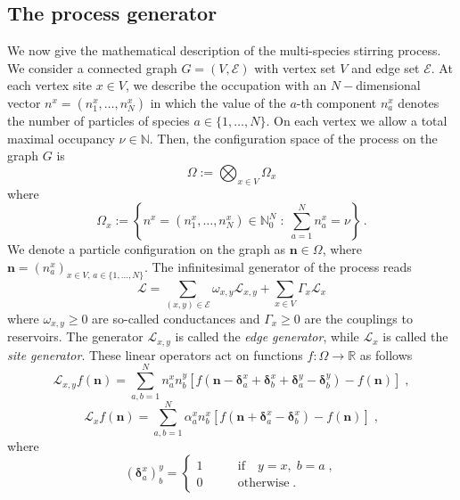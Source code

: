 \documentclass[10pt]{article}
\numberwithin{equation}{section}
\numberwithin{equation}{subsection}
\newcommand{\co}{\;,}
\newcommand{\dt}{\;.}
\newcommand{\twoj}{\nu}
\begin{document}
\subsection{The process generator}\label{subsectionGeneratorStr}
We now give the mathematical description of the multi-species stirring process.
We consider a connected graph $G=(V,\mathcal{E})$ with vertex set $V$ and edge set $\mathcal{E}$.
At each vertex site $x\in V$, we describe the occupation with an $N-$dimensional vector $n^{x}=(n_{1}^{x},\ldots,n_{N}^{x})$ in which the value of the $a$-th component $n_{a}^{x}$ denotes the number of particles of species $a\in \{1,\ldots,N\}$. On each vertex we allow a total  maximal occupancy $\nu\in \mathbb{N}$. Then, the configuration space of the process on the graph $G$ is 
\begin{equation}\label{stateSpace}
    \Omega:=\bigotimes_{x\in V} \Omega_{x}
\end{equation}
where
\begin{equation}
\Omega_{x}:=\left\{n^x=(n_{1}^{x},\ldots,n_{N}^{x})\in\mathbb{N}_0^{N}\;:\; \sum_{a=1}^{N}n_{a}^{x}=\twoj\right\}\,.
\end{equation}
We denote a particle configuration on the graph as $\bm{n}\in \Omega$, where $\bm{n}=(n_{a}^{x})_{x\in V,\,a\in\{1,\ldots,N\}}$.
The infinitesimal generator of the process reads
\begin{equation}\label{Generator}
    \mathcal{L}=\sum_{(x,y)\in \mathcal{E}}\omega_{x,y}\mathcal{L}_{x,y}+\sum_{x\in V}\Gamma_{x}\mathcal{L}_{x}
\end{equation}
where  $ \omega_{x,y}\geq 0$ are so-called conductances and $\Gamma_{x}\geq 0$ are the couplings to reservoirs. 
The generator $\mathcal{L}_{x,y}$ is called the \textit{edge generator}, while $\mathcal{L}_{x}$ is called the \textit{site generator}. These linear operators act on functions $f:\Omega\to \mathbb{R}$ as follows
\begin{equation}\label{edgeGenerator}
\mathcal{L}_{x,y}f(\bm{n})=\sum_{a,b=1}^{N}n_{a}^{x}n_{b}^{y}\left[f(\bm{n}-\bm{\delta}^{x}_{a}+\bm{\delta}_{b}^{x}+\bm{\delta}_{a}^{y}-\bm{\delta}_{b}^{y})-f(\bm{n})\right]\co
\end{equation}
\begin{equation}\label{siteGenerator}
    \mathcal{L}_{x}f(\bm{n})=\sum_{a,b=1}^{N}\alpha_{a}^{x}n_{b}^{x}\left[f(\bm{n}+\bm{\delta}_{a}^{x}-\bm{\delta}_{b}^{x})-f(\bm{n})\right]\co
\end{equation}
where 
\begin{equation}
(\bm{\delta}_{a}^{x})^{y}_{b}=\begin{cases}
1\qquad &\text{if}\quad y=x,\;b=a\;,\\
0\qquad &\text{otherwise}\dt
\end{cases}
\end{equation}
\end{document}
